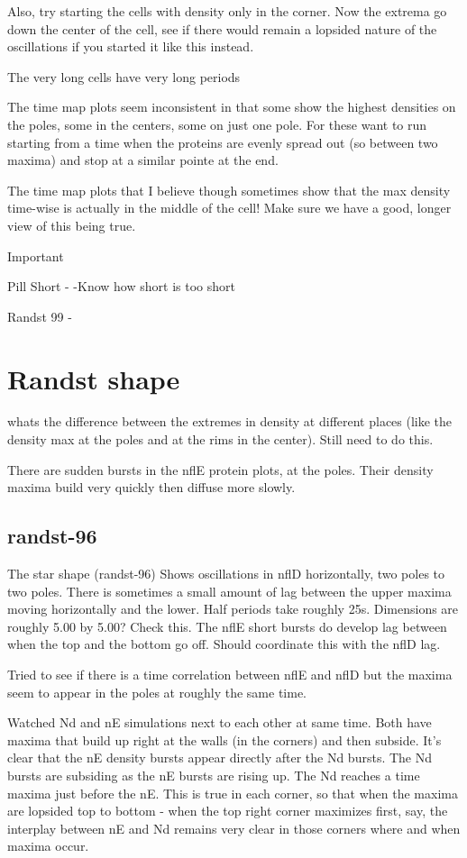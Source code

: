 \documentclass[letterpaper,twocolumn,amsmath,amssymb,pre]{revtex4-1}
\begin{document}
Also, try starting the cells with density only in the corner.  Now the
extrema go down the center of the cell, see if there would remain a
lopsided nature of the oscillations if you started it like this instead.

The very long cells have very long periods

The time map plots seem inconsistent in that some show the highest
densities on the poles, some in the centers, some on just one pole.
For these want to run starting from a time when the proteins are
evenly spread out (so between two maxima) and stop at a similar pointe
at the end.

The time map plots that I believe though sometimes show that the max
density time-wise is actually in the middle of the cell!  Make sure we
have a good, longer view of this being true.


Important


Pill Short -
     -Know how short is too short

Randst 99 -

\section{Randst shape}
whats the difference between the extremes in density at different
places (like the density max at the poles and at the rims in the
center).  Still need to do this.

There are sudden bursts in the nflE protein plots, at the poles. Their
density maxima build very quickly then diffuse more slowly.

\subsection{randst-96}
The star shape (randst-96) Shows oscillations in nflD horizontally,
two poles to two poles.  There is sometimes a small amount of lag
between the upper maxima moving horizontally and the lower.  Half
periods take roughly 25s. Dimensions are roughly 5.00 by 5.00?  Check
this.  The nflE short bursts do develop lag between when the top and
the bottom go off.  Should coordinate this with the nflD lag.

Tried to see if there is a time correlation between nflE and nflD but
the maxima seem to appear in the poles at roughly the same time.

Watched Nd and nE simulations next to each other at same time.  Both
have maxima that build up right at the walls (in the corners) and then
subside.  It's clear that the nE density bursts appear directly after
the Nd bursts.  The Nd bursts are subsiding as the nE bursts are
rising up.  The Nd reaches a time maxima just before the nE.  This is
true in each corner, so that when the maxima are lopsided top to
bottom - when the top right corner maximizes first, say, the interplay
between nE and Nd remains very clear in those corners where and when
maxima occur.
\end{document}
